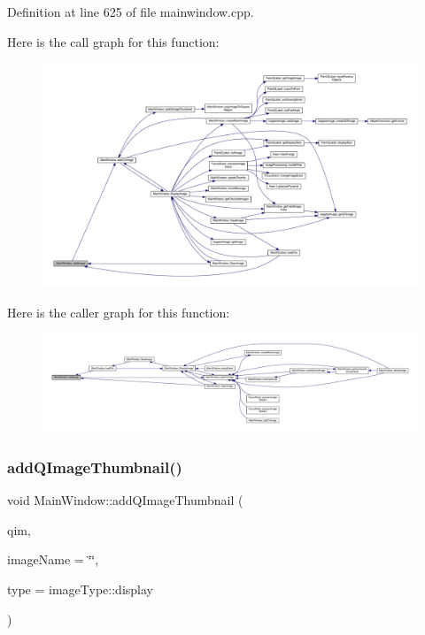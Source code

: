 Definition at line 625 of file mainwindow.\+cpp.

Here is the call graph for this function\+:
\nopagebreak
\begin{figure}[H]
\begin{center}
\leavevmode
\includegraphics[width=350pt]{class_main_window_ab4d1f49d192d3641e0da68b5a69d014a_cgraph}
\end{center}
\end{figure}
Here is the caller graph for this function\+:
\nopagebreak
\begin{figure}[H]
\begin{center}
\leavevmode
\includegraphics[width=350pt]{class_main_window_ab4d1f49d192d3641e0da68b5a69d014a_icgraph}
\end{center}
\end{figure}
\mbox{\label{class_main_window_a8b60c57f82b0ac86df7c64692294a35e}} 
\subsubsection{\texorpdfstring{add\+Q\+Image\+Thumbnail()}{addQImageThumbnail()}}
{\footnotesize\ttfamily void Main\+Window\+::add\+Q\+Image\+Thumbnail (\begin{DoxyParamCaption}\item[{Q\+Image \&}]{qim,  }\item[{Q\+String}]{image\+Name = {\ttfamily \char`\"{}\char`\"{}},  }\item[{image\+Type\+::image\+Type}]{type = {\ttfamily imageType\+:\+:display} }\end{DoxyParamCaption})}

